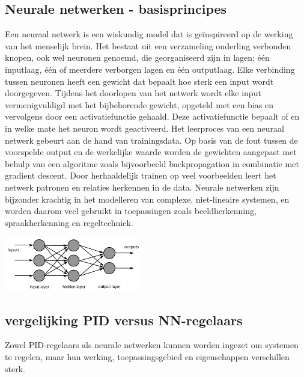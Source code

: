 \subsection{Neurale netwerken - basisprincipes}
\cite{GeeksRNN2024}Een neuraal netwerk is een wiskundig model dat is geïnspireerd op de werking van het menselijk brein. Het bestaat uit een verzameling onderling verbonden knopen, ook wel neuronen genoemd, die georganiseerd zijn in lagen: één inputlaag, één of meerdere verborgen lagen en één outputlaag. Elke verbinding tussen neuronen heeft een gewicht dat bepaalt hoe sterk een input wordt doorgegeven. Tijdens het doorlopen van het netwerk wordt elke input vermenigvuldigd met het bijbehorende gewicht, opgeteld met een bias en vervolgens door een activatiefunctie gehaald. Deze activatiefunctie bepaalt of en in welke mate het neuron wordt geactiveerd. Het leerproces van een neuraal netwerk gebeurt aan de hand van trainingsdata. Op basis van de fout tussen de voorspelde output en de werkelijke waarde worden de gewichten aangepast met behulp van een algoritme zoals bijvoorbeeld backpropagation in combinatie met gradient descent. Door herhaaldelijk trainen op veel voorbeelden leert het netwerk patronen en relaties herkennen in de data. Neurale netwerken zijn bijzonder krachtig in het modelleren van complexe, niet-lineaire systemen, en worden daarom veel gebruikt in toepassingen zoals beeldherkenning, spraakherkenning en regeltechniek.
\begin{center}
\centering
\includegraphics[width=0.45\textwidth]{./afbeeldingen/Neuraalnetwerkpng.png}
\label{fig:Illustratie_neuraal_netwerk}
\end{center}
\subsection{vergelijking PID versus NN-regelaars}
Zowel PID-regelaars als neurale netwerken kunnen worden ingezet om systemen te regelen, maar hun werking, toepassingsgebied en eigenschappen verschillen sterk.
